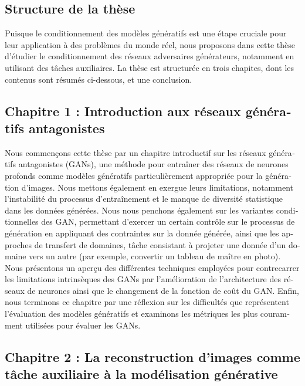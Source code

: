 \begin{otherlanguage}{french}
\section*{Structure de la thèse}

Puisque le conditionnement des modèles génératifs est une étape cruciale pour leur application à des problèmes du monde réel, nous proposons dans cette thèse d'étudier le conditionnement des réseaux adversaires générateurs, notamment en utilisant des tâches auxiliaires. La thèse est structurée en trois chapites, dont les contenus sont résumés ci-dessous, et une conclusion.

\subsection*{Chapitre 1 : Introduction aux réseaux génératifs antagonistes}

Nous commençons cette thèse par un chapitre introductif sur les réseaux génératifs antagonistes (GANs), une méthode pour entraîner des réseaux de neurones profonds comme modèles génératifs particulièrement appropriée pour la génération d'images. Nous mettons également en exergue leurs limitations, notamment l'instabilité du processus d'entraînement et le manque de diversité statistique dans les données générées. Nous nous penchons également sur les variantes conditionnelles des \ac{GAN}, permettant d'exercer un certain contrôle sur le processus de génération en appliquant des contraintes sur la donnée générée, ainsi que les approches de transfert de domaines, tâche consistant à projeter une donnée d'un domaine vers un autre (par exemple, convertir un tableau de maître en photo). Nous présentons un aperçu des différentes techniques employées pour contrecarrer les limitations intrinsèques des GANs par l'amélioration de l'architecture des réseaux de neurones ainsi que le changement de la fonction de coût du GAN. Enfin, nous terminons ce chapitre par une réflexion sur les difficultés que représentent l'évaluation des modèles génératifs et examinons les métriques les plus couramment utilisées pour évaluer les GANs.

\subsection*{Chapitre 2 : La reconstruction d'images comme tâche auxiliaire à la modélisation générative}


\end{otherlanguage}
